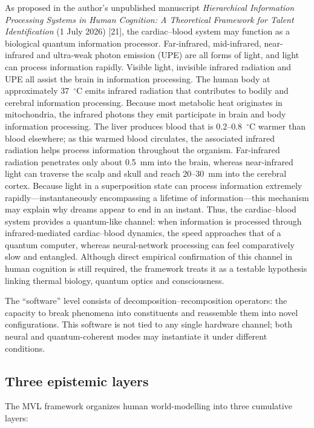 \documentclass[11pt,a4paper]{article}
\begin{document}
As proposed in the author’s unpublished manuscript \textit{Hierarchical Information Processing Systems in Human Cognition: A Theoretical Framework for Talent Identification} (1 July 2026) [21], the cardiac--blood system may function as a biological quantum information processor. Far-infrared, mid-infrared, near-infrared and ultra-weak photon emission (UPE) are all forms of light, and light can process information rapidly. Visible light, invisible infrared radiation and UPE all assist the brain in information processing. The human body at approximately 37~$^\circ$C emits infrared radiation that contributes to bodily and cerebral information processing. Because most metabolic heat originates in mitochondria, the infrared photons they emit participate in brain and body information processing. The liver produces blood that is 0.2--0.8~$^\circ$C warmer than blood elsewhere; as this warmed blood circulates, the associated infrared radiation helps process information throughout the organism. Far-infrared radiation penetrates only about 0.5~mm into the brain, whereas near-infrared light can traverse the scalp and skull and reach 20--30~mm into the cerebral cortex. Because light in a superposition state can process information extremely rapidly---instantaneously encompassing a lifetime of information---this mechanism may explain why dreams appear to end in an instant. Thus, the cardiac--blood system provides a quantum-like channel: when information is processed through infrared-mediated cardiac--blood dynamics, the speed approaches that of a quantum computer, whereas neural-network processing can feel comparatively slow and entangled. Although direct empirical confirmation of this channel in human cognition is still required, the framework treats it as a testable hypothesis linking thermal biology, quantum optics and consciousness.

The ``software'' level consists of decomposition--recomposition operators: the capacity to break phenomena into constituents and reassemble them into novel configurations. This software is not tied to any single hardware channel; both neural and quantum-coherent modes may instantiate it under different conditions.

\subsection{Three epistemic layers}

The MVL framework organizes human world-modelling into three cumulative layers:
\end{document}
